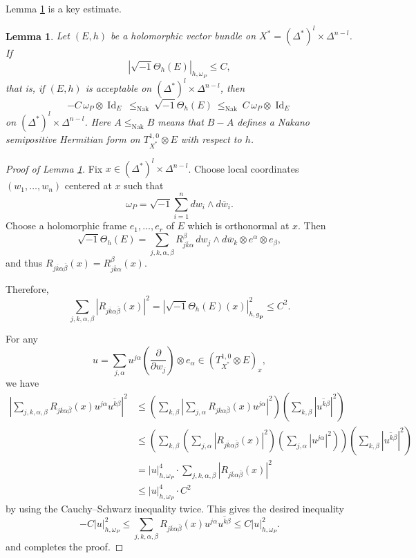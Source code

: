 \documentclass[12pt,twoside]{amsart}
\DeclareMathOperator{\Id}{Id}
\DeclareMathOperator{\Nak}{Nak}
\newtheorem{lem}[thm]{Lemma}
\theoremstyle{definition}
\begin{document}
Lemma \ref{x-lem6.5} is a key estimate.

\begin{lem}\label{x-lem6.5}
Let $(E,h)$ be a holomorphic vector bundle on
$X^*=(\Delta^*)^l\times \Delta^{n-l}$.
If
\[
|\sqrt{-1}\Theta_h(E)|_{h,\omega_P} \le C,
\]
that is, if $(E,h)$ is acceptable on $(\Delta^*)^l\times\Delta^{n-l}$,
then
\[
- C\,\omega_P \otimes \Id_E
   \ \le_{\Nak}\ 
\sqrt{-1}\Theta_h(E)
   \ \le_{\Nak}\ 
C\,\omega_P \otimes \Id_E
\]
on $(\Delta^*)^l\times\Delta^{n-l}$.
Here $A \le_{\Nak} B$ means that $B-A$ defines a Nakano semipositive Hermitian 
form on $T^{1,0}_{X^*}\otimes E$ with respect to $h$.
\end{lem}

\begin{proof}[Proof of Lemma \ref{x-lem6.5}]
Fix $x \in (\Delta^*)^l\times\Delta^{n-l}$.
Choose local coordinates $(w_1,\dots,w_n)$ centered at $x$ such that
\[
\omega_P = \sqrt{-1}\sum_{i=1}^n dw_i \wedge d\overline{w}_i.
\]
Choose a holomorphic frame $e_1,\dots,e_r$ of $E$ which is orthonormal at $x$.
Then
\[
\sqrt{-1}\Theta_h(E)
 = \sum_{j,k,\alpha,\beta}
   R^\beta_{j\overline{k}\alpha}\,
   dw_j \wedge d\overline{w}_k \otimes e^\alpha \otimes e_\beta,
\]
and thus $R_{j\overline{k}\alpha\overline{\beta}}(x)
 = R^\beta_{j\overline{k}\alpha}(x)$.

Therefore,
\[
\sum_{j,k,\alpha,\beta}
 |R_{j\overline{k}\alpha\overline{\beta}}(x)|^2
 = |\sqrt{-1}\Theta_h(E)(x)|_{h,g_{\mathbf{P}}}^2
 \le C^2.
\]

For any
\[
u = \sum_{j,\alpha} u^{j\alpha}
     \left(\frac{\partial}{\partial w_j}\right)\otimes e_\alpha
   \in (T^{1,0}_{X^*}\otimes E)_x,
\]
we have 
\[
\begin{split}
\left| \sum _{j, k, \alpha, \beta} R_{j\overline k \alpha \overline \beta} (x) u^{j\alpha} 
\overline {u^{k\beta}}\right|^2
&\leq 
\left(\sum _{k, \beta} \left| \sum _{j, \alpha}R_{j\overline k\alpha\overline \beta} (x) 
u^{j\alpha} \right|^2\right)
\left(\sum _{k, \beta} |\overline {u^{k\beta}}|^2\right)\\ 
&\leq 
\left(\sum _{k, \beta} \left( \sum _{j, \alpha} \left|
R_{j\overline k\alpha\overline \beta} (x)\right|^2\right)
\left(\sum _{j, \alpha} |u^{j\alpha}|^2\right) \right)
\left(\sum _{k, \beta} |\overline {u^{k\beta}}|^2\right)\\
&= |u|^4_{h,\omega_P} \cdot \sum _{j, k, \alpha, \beta} \left|R_{j \overline k 
\alpha\overline \beta}(x)\right|^2
\\ 
&\leq |u|^4_{h, \omega_P} \cdot C^2  
\end{split} 
\] 
by using the Cauchy--Schwarz inequality twice. 
This gives the desired inequality 
\[
-C |u|^2_{h, \omega_P} \leq \sum _{j, k, \alpha, \beta} R_{j\overline k\alpha 
\overline \beta}(x) u^{j\alpha} \overline{u^{k\beta}}\leq C|u|^2_{h, \omega_P}. 
\]
and completes the proof.
\end{proof}
\end{document}

